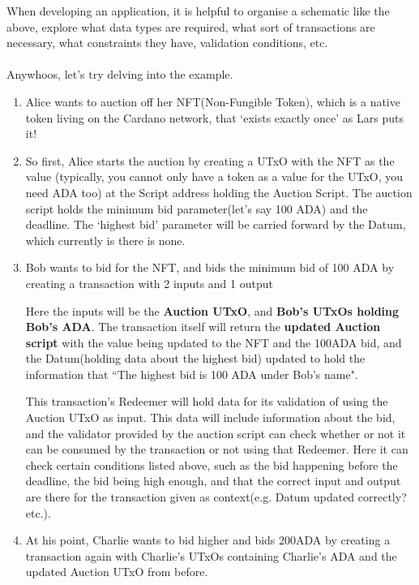 \documentclass[a4paper, 11pt]{article}
\begin{document}
    When developing an application, it is helpful to organise a schematic like the above, explore what data types are required, what sort of transactions are necessary, what constraints they have, validation conditions, etc.

    \paragraph{} Anywhoos, let's try delving into the example. 

    \begin{enumerate}
        \item Alice wants to auction off her NFT(Non-Fungible Token), which is a native token living on the Cardano network, that `exists exactly once' as Lars puts it!
        \item So first, Alice starts the auction by creating a UTxO with the NFT as the value (typically, you cannot only have a token as a value for the UTxO, you need ADA too) at the Script address holding the Auction Script. The auction script holds the minimum bid parameter(let's say 100 ADA) and the deadline. The `highest bid' parameter will be carried forward by the Datum, which currently is there is none.
        \item Bob wants to bid for the NFT, and bids the minimum bid of 100 ADA by creating a transaction with 2 inputs and 1 output
        
        Here the inputs will be the \textbf{Auction UTxO}, and \textbf{Bob's UTxOs holding Bob's ADA}. The transaction itself will return the \textbf{updated Auction script} with the value being updated to the NFT and the 100ADA bid, and the Datum(holding data about the highest bid) updated to hold the information that ``The highest bid is 100 ADA under Bob's name".

        This transaction's Redeemer will hold data for its validation of using the Auction UTxO as input. This data will include information about the bid, and the validator provided by the auction script can check whether or not it can be consumed by the transaction or not using that Redeemer. Here it can check certain conditions listed above, such as the bid happening before the deadline, the bid being high enough, and that the correct input and output are there for the transaction given as context(e.g. Datum updated correctly? etc.).

        \item At his point, Charlie wants to bid higher and bids 200ADA by creating a transaction again with Charlie's UTxOs containing Charlie's ADA and the updated Auction UTxO from before.
        

\end{enumerate}
\end{document}

